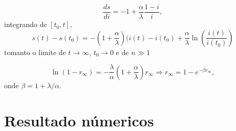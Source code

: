 \documentclass[]{article}
\begin{document}
\begin{equation}
\frac{ds}{di}=-1+\frac{\alpha}{\lambda}\frac{1-i}{i},
\end{equation}
integrando de $[t_0, t]$, 
\begin{equation}
s(t)-s(t_0)=-\left(1+\frac{\alpha}{\lambda}\right)(i(t)-i(t_0)+\frac{\alpha}{\lambda}\ln\left(\frac{i(t)}{i(t_0)}\right)
\end{equation}
tomanto o limite de $t\to\infty$, $t_0\to 0$ e de $n\gg 1$

\begin{equation}
\ln(1-r_{\infty})=-\frac{\lambda}{\alpha}\left(1+\frac{\alpha}{\lambda}\right)r_{\infty}\Rightarrow r_{\infty}=1-e^{-\beta r_{\infty}},
\end{equation}
onde $\beta=1+\lambda/\alpha$.

\section{Resultado n\'umericos}
\end{document}
